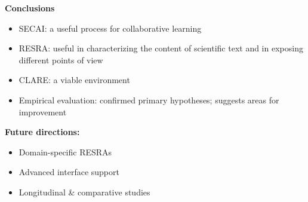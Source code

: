 \begin{slide} \Huge 
  {\bf Conclusions}
  \horizontalline

  \begin{itemize}
    \item SECAI: a useful process for collaborative learning
      
    \item RESRA: useful in characterizing the content of
      scientific text and in exposing different points of view
    
    \item CLARE: a viable environment
    
    \item Empirical evaluation: confirmed primary hypotheses;
      suggests areas for improvement
    
  \end{itemize}
\end{slide} \Huge


\begin{slide} \Huge
  {\bf Future directions:}
  \horizontalline

  \begin{itemize}
    \item Domain-specific RESRAs 
      
    \item Advanced interface support
      
    \item Longitudinal \& comparative studies
  \end{itemize}
\end{slide} \Huge


\begin{slide} \Huge 
  \centerline{}
\end{slide} \Huge












